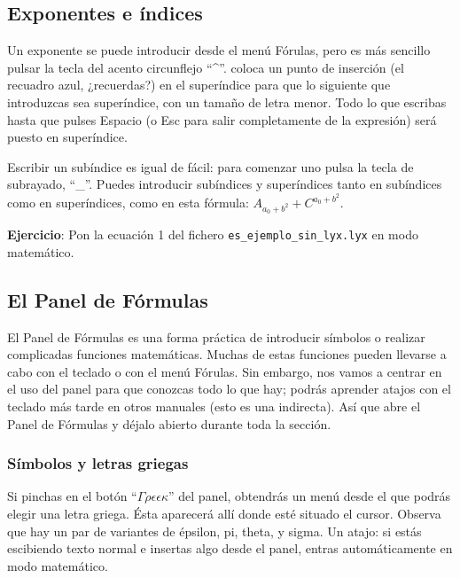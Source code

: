 \subsection{Exponentes e índices}

Un exponente se puede introducir desde el menú \textsf{Fór}\textsf{}\textsf{ulas},
pero es más sencillo pulsar la tecla del acento circunflejo {}``\textasciicircum{}''.
\LyX{} coloca un punto de inserción (el recuadro azul, ¿recuerdas?)
en el superíndice para que lo siguiente que introduzcas sea superíndice,
con un tamaño de letra menor. Todo lo que escribas hasta que pulses
\textsf{Espacio} (o \textsf{Esc} para salir completamente de la expresión)
será puesto en superíndice.

Escribir un subíndice es igual de fácil: para comenzar uno pulsa la
tecla de subrayado, {}``\_''. Puedes introducir subíndices y superíndices
tanto en subíndices como en superíndices, como en esta fórmula: $A_{a_{0}+b^{2}}+C^{a_{0}+b^{2}}$. 

\textbf{Ejercicio}: Pon la ecuación 1 del fichero \texttt{es\_ejemplo\_sin\_lyx.lyx}
en modo matemático.


\subsection{El \textsf{Panel de Fórmulas}}

El \textsf{Panel de Fórmulas} es una forma práctica de introducir
símbolos o realizar complicadas funciones matemáticas. Muchas de estas
funciones pueden llevarse a cabo con el teclado o con el menú \textsf{Fór}\textsf{}\textsf{ulas}.
Sin embargo, nos vamos a centrar en el uso del panel para que conozcas
todo lo que hay; podrás aprender atajos con el teclado más tarde en
otros manuales (esto es una indirecta). Así que abre el \textsf{Panel
de Fórmulas} y déjalo abierto durante toda la sección.


\subsubsection{Símbolos y letras griegas}

Si pinchas en el botón {}``$\Gamma\rho\epsilon\epsilon\kappa$''
del panel, obtendrás un menú desde el que podrás elegir una letra
griega. Ésta aparecerá allí donde esté situado el cursor. Observa
que hay un par de variantes de épsilon, pi, theta, y sigma. Un atajo:
si estás escibiendo texto normal e insertas algo desde el panel, entras
automáticamente en modo matemático.

